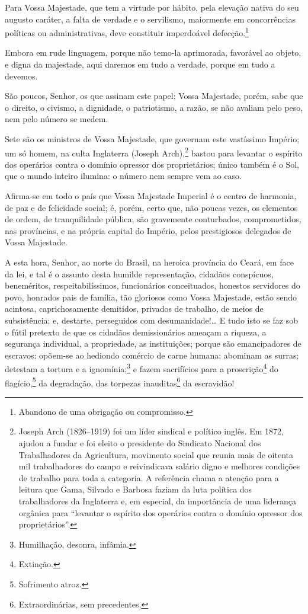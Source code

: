 {Para Vossa Majestade, que tem a virtude por hábito, pela elevação nativa
do seu augusto caráter, a falta de verdade e o servilismo, maiormente em
concorrências políticas ou administrativas, deve constituir imperdoável
defecção.\footnote{Abandono de uma obrigação ou compromisso.}

Embora em rude linguagem, porque não temo-la aprimorada, favorável ao
objeto, e digna da majestade, aqui daremos em tudo a verdade, porque em
tudo a devemos.

São poucos, Senhor, os que assinam este papel; Vossa Majestade, porém,
sabe que o direito, o civismo, a dignidade, o patriotismo, a razão, se
não avaliam pelo peso, nem pelo número se medem.

Sete são os ministros de Vossa Majestade, que governam este vastíssimo
Império; um só homem, na culta Inglaterra (Joseph Arch),\footnote{
  Joseph Arch (1826--1919) foi um líder sindical e político inglês. Em
  1872, ajudou a fundar e foi eleito o presidente do Sindicato Nacional
  dos Trabalhadores da Agricultura, movimento social que reunia mais de
  oitenta mil trabalhadores do campo e reivindicava salário digno e
  melhores condições de trabalho para toda a categoria. A referência chama
  a atenção para a leitura que Gama, Silvado e Barbosa faziam
  da luta política dos trabalhadores da Inglaterra e, em especial, da
  importância de uma liderança orgânica para ``levantar o espírito dos
  operários contra o domínio opressor dos proprietários''.} bastou para
levantar o espírito dos operários contra o domínio opressor dos
proprietários; único também é o Sol, que o mundo inteiro ilumina: o
número nem sempre vem ao caso.

Afirma-se em todo o país que Vossa Majestade Imperial é o centro de
harmonia, de paz e de felicidade social; é, porém, certo que, não poucas
vezes, os elementos de ordem, de tranquilidade pública, são gravemente
conturbados, comprometidos, nas províncias, e na própria capital do
Império, pelos prestigiosos delegados de Vossa Majestade.

A esta hora, Senhor, ao norte do Brasil, na heroica província do Ceará,
em face da lei, e tal é o assunto desta humilde representação, cidadãos
conspícuos, beneméritos, respeitabilíssimos, funcionários conceituados,
honestos servidores do povo, honrados pais de família, tão gloriosos
como Vossa Majestade, estão sendo acintosa, caprichosamente demitidos,
privados de trabalho, de meios de subsistência; e, destarte, perseguidos
com desumanidade!\ldots{} E tudo isto se faz sob o fútil pretexto de que os
cidadãos demissionários ameaçam a riqueza, a segurança individual, a
propriedade, as instituições; porque são emancipadores de escravos;
opõem-se ao hediondo comércio de carne humana; abominam as surras;
detestam a tortura e a ignomínia;\footnote{Humilhação, desonra,
  infâmia.} e fazem sacrifícios para a proscrição\footnote{Extinção.}
do flagício,\footnote{Sofrimento atroz.} da degradação, das torpezas
inauditas\footnote{Extraordinárias, sem precedentes.} da escravidão!

}
